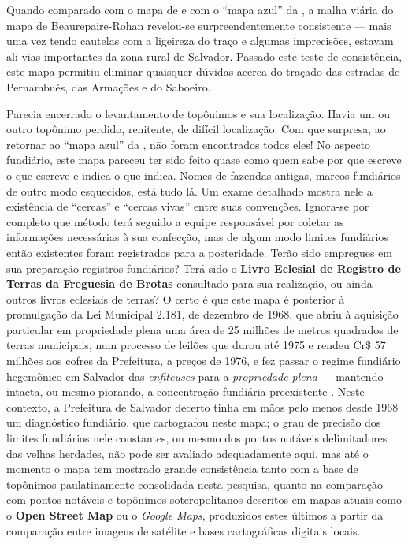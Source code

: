 Quando comparado com o mapa de  e com o ``mapa azul'' da , a malha viária do mapa de Beaurepaire-Rohan revelou-se surpreendentemente consistente --- mais uma vez tendo cautelas com a ligeireza do traço e algumas imprecisões, estavam ali vias importantes da zona rural de Salvador. Passado este teste de consistência, este mapa permitiu eliminar quaisquer dúvidas acerca do traçado das estradas de Pernambués, das Armações e do Saboeiro.

Parecia encerrado o levantamento de topônimos e sua localização. Havia um ou outro topônimo perdido, renitente, de difícil localização. Com que surpresa, ao retornar ao ``mapa azul'' da , não foram encontrados todos eles! No aspecto fundiário, este mapa pareceu ter sido feito quase como quem sabe por que escreve o que escreve e indica o que indica. Nomes de fazendas antigas, marcos fundiários de outro modo esquecidos, está tudo lá. Um exame detalhado mostra nele a existência de ``cercas'' e ``cercas vivas'' entre suas convenções. Ignora-se por completo que método terá seguido a equipe responsável por coletar as informações necessárias à sua confecção, mas de algum modo limites fundiários então existentes foram registrados para a posteridade. Terão sido empregues em sua preparação registros fundiários? Terá sido o \textbf{Livro Eclesial de Registro de Terras da Freguesia de Brotas} consultado para sua realização, ou ainda outros livros eclesiais de terras? O certo é que este mapa é posterior à promulgação da Lei Municipal 2.181, de dezembro de 1968, que abriu à aquisição particular em propriedade plena uma área de 25 milhões de metros quadrados de terras municipais, num processo de leilões que durou até 1975 e rendeu Cr\$ 57 milhões aos cofres da Prefeitura, a preços de 1976, e fez passar o regime fundiário hegemônico em Salvador das \textit{enfiteuses} para a \textit{propriedade plena} --- mantendo intacta, ou mesmo piorando, a concentração fundiária preexistente \cite{BRANDAO1980,SIMOES1985,VASCONCELLOS1974}. Neste contexto, a Prefeitura de Salvador decerto tinha em mãos pelo menos desde 1968 um diagnóstico fundiário, que cartografou neste mapa; o grau de precisão dos limites fundiários nele constantes, ou mesmo dos pontos notáveis delimitadores das velhas herdades, não pode ser avaliado adequadamente aqui, mas até o momento o mapa tem mostrado grande consistência tanto com a base de topônimos paulatinamente consolidada nesta pesquisa, quanto na comparação com pontos notáveis e topônimos soteropolitanos descritos em mapas atuais como o \textbf{Open Street Map} ou o \textit{Google Maps}, produzidos estes últimos a partir da comparação entre imagens de satélite e bases cartográficas digitais locais.

